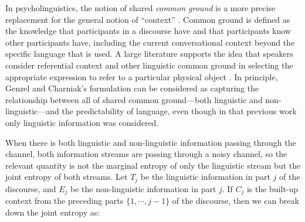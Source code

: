 \documentclass[11pt,letterpaper]{article}
\begin{document}
In psycholinguistics, the notion of shared \emph{common ground} is a more precise replacement for the general notion of ``context'' \cite{clark1996}. Common ground is defined as the knowledge that participants in a discourse have and that participants know other participants have, including the current conversational context beyond the specific language that is used. A large literature supports the idea that speakers consider referential context and other linguistic common ground in selecting the appropriate expression to refer to a particular physical object \cite{brennan1996,metzing2003,dale1995,sedivy1999}. In principle, Genzel and Charniak's formulation can be considered as capturing the relationship between all of shared common ground---both linguistic and non-linguistic---and the predictability of language, even though in that previous work only linguistic information was considered. 

When there is both linguistic and non-linguistic information passing through the channel, both information streams are passing through a noisy channel, so the relevant quantity is not the marginal entropy of only the linguistic stream but the joint entropy of both streams.  Let $T_j$ be the linguistic information in part $j$ of the discourse, and $E_j$ be the non-linguistic information in part $j$.  If $C_j$ is the built-up context from the preceding parts $\{1,\cdots,j-1\}$ of the discourse, then we can break down the joint entropy as:\vspace*{-1.5em}

\end{document}
